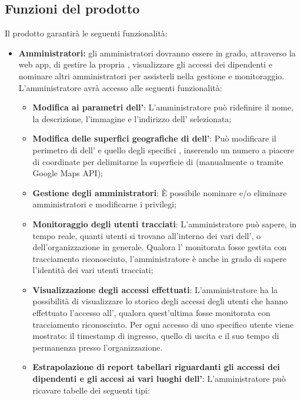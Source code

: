 \subsection{Funzioni del prodotto}
Il prodotto garantirà le seguenti funzionalità:
\begin{itemize}
    \item \textbf{Amministratori:} gli amministratori dovranno essere in grado, attraverso la web app, di gestire la propria , visualizzare gli accessi dei dipendenti e nominare altri amministratori per assisterli nella gestione e monitoraggio. \\
        L'amministratore avrà accesso alle seguenti funzionalità:
        \begin{itemize}
            \item \textbf{Modifica ai parametri dell'}: L'amministratore può ridefinire il nome, la descrizione, l'immagine e l'indirizzo dell' selezionata;
            \item \textbf{Modifica delle superfici geografiche di  dell'}: Può modificare il perimetro di  dell' e quello degli specifici , inserendo un numero a piacere di coordinate per delimitarne la superficie di  (manualmente o tramite Google Maps API);
            \item \textbf{Gestione degli amministratori}: È possibile nominare e/o eliminare amministratori e modificarne i privilegi;
            \item \textbf{Monitoraggio degli utenti tracciati}: L'amministratore può sapere, in tempo reale, quanti utenti si trovano all'interno dei vari  dell', o dell'organizzazione in generale. Qualora l' monitorata fosse gestita con tracciamento riconosciuto, l'amministratore è anche in grado di sapere l'identità dei vari utenti tracciati;
            \item \textbf{Visualizzazione degli accessi effettuati}: L'amministratore ha la possibilità di visualizzare lo storico degli accessi degli utenti che hanno effettuato l'accesso all', qualora quest'ultima fosse monitorata con tracciamento riconosciuto. Per ogni accesso di uno specifico utente viene mostrato: il timestamp di ingresso, quello di uscita e il suo tempo di permanenza presso l'organizzazione.
            \item \textbf{Estrapolazione di report tabellari riguardanti gli accessi dei dipendenti e gli accesi ai vari luoghi dell'}: L'amministratore può ricavare tabelle dei seguenti tipi:

\end{itemize}
\end{itemize}
